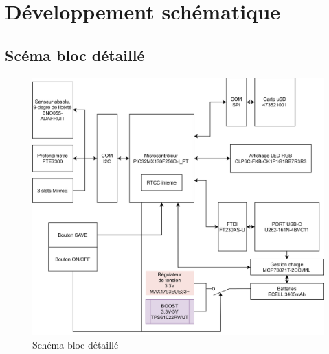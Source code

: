 \section{Développement schématique}

\subsection{Scéma bloc détaillé}
{
	\begin{figure}[h]
		\centering
		\includegraphics[width=1\linewidth]{Figures/Dev-SCH/Schema-bloc-detail}
		\caption{Schéma bloc détaillé}
		\label{fig:schema-bloc-detail}
	\end{figure}
}

\clearpage
